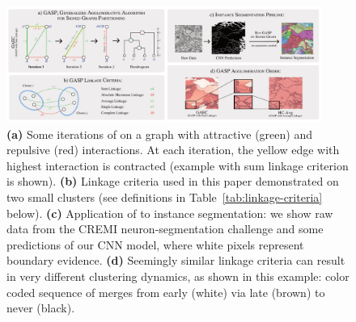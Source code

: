 
\begin{figure}[t]
\centering
\includegraphics[width=0.92\textwidth]{figs/intro_image_v6.pdf} %
\caption{\textbf{(a)} Some iterations of \algname{} on a graph with attractive (green) and repulsive (red) interactions. At each iteration, the yellow edge with highest interaction is contracted (example with sum linkage criterion is shown). \textbf{(b)} Linkage criteria used in this paper demonstrated on two small clusters (see definitions in Table~\ref{tab:linkage-criteria} below).  \textbf{(c)} Application of \algname{} to instance segmentation: we show raw data from the CREMI neuron-segmentation challenge and some predictions of our CNN model, where white pixels represent boundary evidence. \textbf{(d)} 
Seemingly similar linkage criteria can result in very different clustering dynamics, as shown in this example: color coded sequence of merges from early (white) via late (brown) to never (black).
\label{fig:intro_figure}}
\end{figure}

